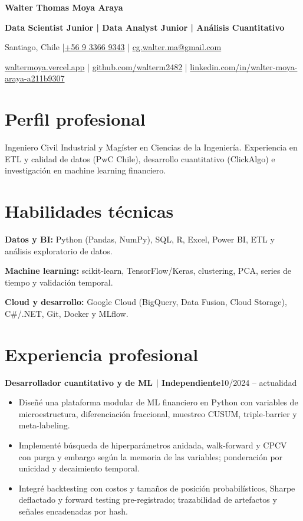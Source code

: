 \documentclass[10pt,a4paper]{article}
\newcommand{\entry}[2]{\par\addvspace{3pt}\textbf{#1}\hfill{\fontsize{9.5}{11}\selectfont\color{muted}#2}\par\nopagebreak}
\begin{document}
\fontsize{10.7}{12.5}\selectfont
\RaggedRight
{}

{\fontsize{23}{26}\selectfont\bfseries\color{navy}Walter Thomas Moya Araya}\par
{\fontsize{11}{13}\selectfont\bfseries Data Scientist Junior | Data Analyst Junior | Análisis Cuantitativo}\par
{\fontsize{9.7}{11.5}\selectfont
Santiago, Chile \enspace|\enspace \href{tel:+56933669343}{+56 9 3366 9343} \enspace|\enspace
\href{mailto:cg.walter.ma@gmail.com}{cg.walter.ma@gmail.com}\par
\href{https://waltermoya.vercel.app/}{waltermoya.vercel.app} \enspace|\enspace
\href{https://github.com/walterm2482}{github.com/walterm2482} \enspace|\enspace
\href{https://www.linkedin.com/in/walter-moya-araya-a211b9307/}{linkedin.com/in/walter-moya-araya-a211b9307}}

\section{Perfil profesional}
Ingeniero Civil Industrial y Magíster en Ciencias de la Ingeniería. Experiencia en ETL y calidad de datos
(PwC Chile), desarrollo cuantitativo (ClickAlgo) e investigación en machine learning financiero.

\section{Habilidades técnicas}
\textbf{Datos y BI:} Python (Pandas, NumPy), SQL, R, Excel, Power BI, ETL y análisis exploratorio de datos.\par
\textbf{Machine learning:} scikit-learn, TensorFlow/Keras, clustering, PCA, series de tiempo y validación temporal.\par
\textbf{Cloud y desarrollo:} Google Cloud (BigQuery, Data Fusion, Cloud Storage), C\#/.NET, Git, Docker y MLflow.

\section{Experiencia profesional}
\entry{Desarrollador cuantitativo y de ML | Independiente}{10/2024 -- actualidad}
\begin{itemize}
  \item Diseñé una plataforma modular de ML financiero en Python con variables de microestructura,
  diferenciación fraccional, muestreo CUSUM, triple-barrier y meta-labeling.
  \item Implementé búsqueda de hiperparámetros anidada, walk-forward y CPCV con purga y embargo según
  la memoria de las variables; ponderación por unicidad y decaimiento temporal.
  \item Integré backtesting con costos y tamaños de posición probabilísticos, Sharpe deflactado y forward
  testing pre-registrado; trazabilidad de artefactos y señales encadenadas por hash.
\end{itemize}
\end{document}
